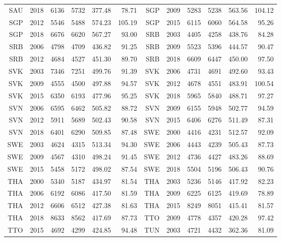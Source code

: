 {\begin{longtable}{r|r|r|r|r|r||r|r|r|r|r|r}
    SAU   & 2018  & 6136  & 5732  & 377.48 & 78.71 & SGP   & 2009  & 5283  & 5238  & 563.56 & 104.12 \\
    SGP   & 2012  & 5546  & 5488  & 574.23 & 105.19 & SGP   & 2015  & 6115  & 6060  & 564.58 & 95.26 \\
    SGP   & 2018  & 6676  & 6620  & 567.27 & 93.00 & SRB   & 2003  & 4405  & 4258  & 438.76 & 84.28 \\
    SRB   & 2006  & 4798  & 4709  & 436.82 & 91.25 & SRB   & 2009  & 5523  & 5396  & 444.57 & 90.47 \\
    SRB   & 2012  & 4684  & 4527  & 451.30 & 89.70 & SRB   & 2018  & 6609  & 6447  & 450.00 & 97.50 \\
    SVK   & 2003  & 7346  & 7251  & 499.76 & 91.39 & SVK   & 2006  & 4731  & 4691  & 492.60 & 93.43 \\
    SVK   & 2009  & 4555  & 4500  & 497.88 & 94.57 & SVK   & 2012  & 4678  & 4551  & 483.91 & 100.54 \\
    SVK   & 2015  & 6350  & 6193  & 477.96 & 95.25 & SVK   & 2018  & 5965  & 5840  & 488.71 & 97.27 \\
    SVN   & 2006  & 6595  & 6462  & 505.82 & 88.72 & SVN   & 2009  & 6155  & 5948  & 502.77 & 94.59 \\
    SVN   & 2012  & 5911  & 5689  & 502.43 & 90.58 & SVN   & 2015  & 6406  & 6276  & 511.49 & 87.31 \\
    SVN   & 2018  & 6401  & 6290  & 509.85 & 87.48 & SWE   & 2000  & 4416  & 4231  & 512.57 & 92.09 \\
    SWE   & 2003  & 4624  & 4315  & 513.34 & 94.30 & SWE   & 2006  & 4443  & 4239  & 505.43 & 87.73 \\
    SWE   & 2009  & 4567  & 4310  & 498.24 & 91.45 & SWE   & 2012  & 4736  & 4427  & 483.26 & 88.69 \\
    SWE   & 2015  & 5458  & 5172  & 498.02 & 87.54 & SWE   & 2018  & 5504  & 5196  & 506.43 & 90.76 \\
    THA   & 2000  & 5340  & 5187  & 434.97 & 81.54 & THA   & 2003  & 5236  & 5146  & 417.92 & 82.23 \\
    THA   & 2006  & 6192  & 6086  & 417.50 & 81.59 & THA   & 2009  & 6225  & 6125  & 419.69 & 78.89 \\
    THA   & 2012  & 6606  & 6512  & 427.38 & 81.63 & THA   & 2015  & 8249  & 8051  & 415.41 & 81.57 \\
    THA   & 2018  & 8633  & 8562  & 417.69 & 87.73 & TTO   & 2009  & 4778  & 4357  & 420.28 & 97.42 \\
    TTO   & 2015  & 4692  & 4299  & 424.85 & 94.48 & TUN   & 2003  & 4721  & 4432  & 362.36 & 81.09 \\

\end{longtable}}
